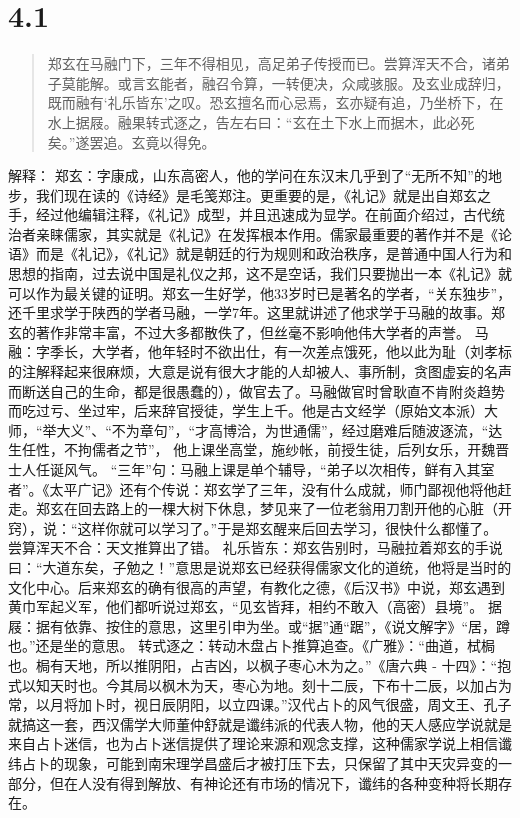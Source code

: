 \documentclass[]{book}
\begin{document}
\section{4.1}\label{section-181}

\begin{quote}
郑玄在马融门下，三年不得相见，高足弟子传授而已。尝算浑天不合，诸弟子莫能解。或言玄能者，融召令算，一转便决，众咸骇服。及玄业成辞归，既而融有`礼乐皆东'之叹。恐玄擅名而心忌焉，玄亦疑有追，乃坐桥下，在水上据屐。融果转式逐之，告左右曰：``玄在土下水上而据木，此必死矣。''遂罢追。玄竟以得免。
\end{quote}

解释：
郑玄：字康成，山东高密人，他的学问在东汉末几乎到了``无所不知''的地步，我们现在读的《诗经》是毛笺郑注。更重要的是，《礼记》就是出自郑玄之手，经过他编辑注释，《礼记》成型，并且迅速成为显学。在前面介绍过，古代统治者亲睐儒家，其实就是《礼记》在发挥根本作用。儒家最重要的著作并不是《论语》而是《礼记》，《礼记》就是朝廷的行为规则和政治秩序，是普通中国人行为和思想的指南，过去说中国是礼仪之邦，这不是空话，我们只要抛出一本《礼记》就可以作为最关键的证明。郑玄一生好学，他33岁时已是著名的学者，``关东独步''，还千里求学于陕西的学者马融，一学7年。这里就讲述了他求学于马融的故事。郑玄的著作非常丰富，不过大多都散佚了，但丝毫不影响他伟大学者的声誉。
马融：字季长，大学者，他年轻时不欲出仕，有一次差点饿死，他以此为耻（刘孝标的注解释起来很麻烦，大意是说有很大才能的人却被人、事所制，贪图虚妄的名声而断送自己的生命，都是很愚蠢的），做官去了。马融做官时曾耿直不肯附炎趋势而吃过亏、坐过牢，后来辞官授徒，学生上千。他是古文经学（原始文本派）大师，``举大义''、``不为章句''，``才高博洽，为世通儒''，经过磨难后随波逐流，``达生任性，不拘儒者之节''，
他上课坐高堂，施纱帐，前授生徒，后列女乐，开魏晋士人任诞风气。
``三年''句：马融上课是单个辅导，``弟子以次相传，鲜有入其室者''。《太平广记》还有个传说：郑玄学了三年，没有什么成就，师门鄙视他将他赶走。郑玄在回去路上的一棵大树下休息，梦见来了一位老翁用刀割开他的心脏（开窍），说：``这样你就可以学习了。''于是郑玄醒来后回去学习，很快什么都懂了。
尝算浑天不合：天文推算出了错。
礼乐皆东：郑玄告别时，马融拉着郑玄的手说曰：``大道东矣，子勉之！''意思是说郑玄已经获得儒家文化的道统，他将是当时的文化中心。后来郑玄的确有很高的声望，有教化之德，《后汉书》中说，郑玄遇到黄巾军起义军，他们都听说过郑玄，``见玄皆拜，相约不敢入（高密）县境''。
据屐：据有依靠、按住的意思，这里引申为坐。或``据''通``踞''，《说文解字》``居，蹲也。''还是坐的意思。
转式逐之：转动木盘占卜推算追查。《广雅》：``曲道，栻梮也。梮有天地，所以推阴阳，占吉凶，以枫子枣心木为之。''《唐六典
-
十四》：``抱式以知天时也。今其局以枫木为天，枣心为地。刻十二辰，下布十二辰，以加占为常，以月将加卜时，视日辰阴阳，以立四课。''汉代占卜的风气很盛，周文王、孔子就搞这一套，西汉儒学大师董仲舒就是谶纬派的代表人物，他的天人感应学说就是来自占卜迷信，也为占卜迷信提供了理论来源和观念支撑，这种儒家学说上相信谶纬占卜的现象，可能到南宋理学昌盛后才被打压下去，只保留了其中天灾异变的一部分，但在人没有得到解放、有神论还有市场的情况下，谶纬的各种变种将长期存在。
\end{document}
